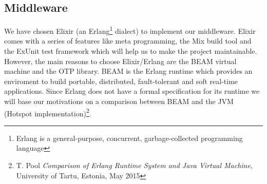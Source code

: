 \subsection{Middleware}
We have chosen Elixir (an Erlang\footnote{Erlang is a general-purpose, 
concurrent, garbage-collected programming language} dialect) to implement 
our middleware. Elixir comes with a series of features like meta programming, 
the Mix build tool and the ExUnit test framework which will help us to make 
the project maintainable.
However, the main reasons to choose Elixir/Erlang are the BEAM virtual machine
and the OTP library.
BEAM is the Erlang runtime which provides an enviroment to build portable, 
distributed, fault-tolerant and soft real-time applications.
Since Erlang does not have a formal specification for its runtime we will
 base our motivations on a comparison between BEAM and the JVM 
(Hotspot implementation)\footnote{T. Pool \textit{Comparison of Erlang Runtime 
System and Java Virtual Machine}, University of Tartu, Estonia, May 2015}.

